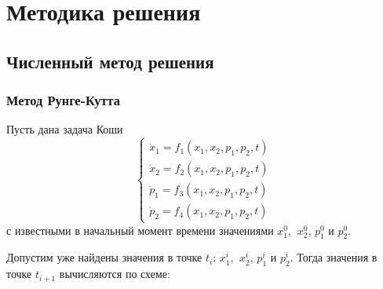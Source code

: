 \documentclass[a4paper,12pt]{article}
\begin{document}
\section*{Методика решения}

\subsection*{Численный метод решения}

\subsubsection*{Метод Рунге-Кутта}

Пусть дана задача Коши
\begin{equation*}
  \begin{cases}
    \dot{x}_1=f_1(x_1,x_2,p_1,p_2,t)\\
    \dot{x}_2=f_2(x_1,x_2,p_1,p_2,t)\\
    \dot{p}_1=f_3(x_1,x_2,p_1,p_2,t)\\
    \dot{p}_2=f_4(x_1,x_2,p_1,p_2,t)
  \end{cases}
\end{equation*}
с известными в начальный момент времени значениями \(x_1^0\), \(\ x_2^0\), \(p_1^0\) и \(p_2^0\).

Допустим уже найдены значения в точке \(t_i\): \(x_1^i\), \(\ x_2^i\), \(p_1^i\) и \(p_2^i\). Тогда значения в точке \(t_{i+1}\) вычисляются по
схеме:
\end{document}
